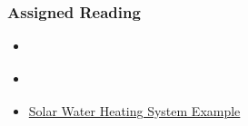 \documentclass[t,12pt,numbers,fleqn]{beamer}
\begin{document}
\begin{frame}
\frametitle{Assigned Reading}

\begin {itemize}

\item \href{https://gitlab.cas.mcmaster.ca/smiths/cas741/blob/master/ReferenceMaterial/SoftEngForScienceBook.pdf}{}
\item \href{https://gitlab.cas.mcmaster.ca/smiths/cas741/blob/master/ReferenceMaterial/SmithLaiAndKhedri2007fulltext.pdf}{}
\item \href{https://github.com/smiths/swhs}{Solar Water Heating System Example}
\end{itemize}

\end{frame}

\end{document}

